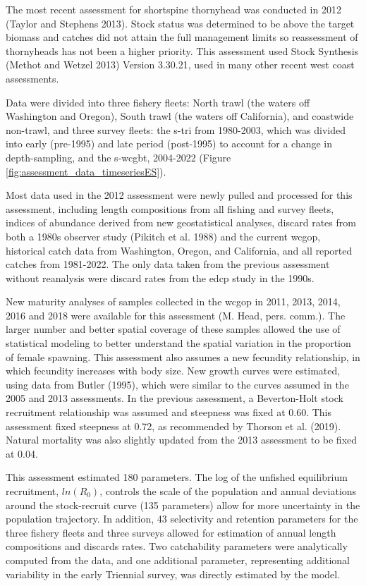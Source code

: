 \documentclass[11pt,
  english,
  letterpaper,
]{article}
\begin{document}
The most recent assessment for shortspine thornyhead was conducted in 2012 (Taylor and Stephens 2013). Stock status was determined to be above the target biomass and catches did not attain the full management limits so reassessment of thornyheads has not been a higher priority. This assessment used Stock Synthesis (Methot and Wetzel 2013) Version 3.30.21, used in many other recent west coast assessments.

Data were divided into three fishery fleets: North trawl (the waters off Washington and Oregon), South trawl (the waters off California), and coastwide non-trawl, and three survey fleets: the \gls{s-tri} from 1980-2003, which was divided into early (pre-1995) and late period (post-1995) to account for a change in depth-sampling, and the \gls{s-wcgbt}, 2004-2022 (Figure \ref{fig:assessment_data_timeseriesES}).

Most data used in the 2012 assessment were newly pulled and processed for this assessment, including length compositions from all fishing and survey fleets, indices of abundance derived from new geostatistical analyses, discard rates from both a 1980s observer study (Pikitch et al. 1988) and the current \gls{wcgop}, historical catch data from Washington, Oregon, and California, and all reported catches from 1981-2022. The only data taken from the previous assessment without reanalysis were discard rates from the \gls{edcp} study in the 1990s.

New maturity analyses of samples collected in the \gls{wcgop} in 2011, 2013, 2014, 2016 and 2018 were available for this assessment (M. Head, pers. comm.). The larger number and better spatial coverage of these samples allowed the use of statistical modeling to better understand the spatial variation in the proportion of female spawning. This assessment also assumes a new fecundity relationship, in which fecundity increases with body size. New growth curves were estimated, using data from Butler (1995), which were similar to the curves assumed in the 2005 and 2013 assessments. In the previous assessment, a Beverton-Holt stock recruitment relationship was assumed and steepness was fixed at 0.60. This assessment fixed steepness at 0.72, as recommended by Thorson et al. (2019). Natural mortality was also slightly updated from the 2013 assessment to be fixed at 0.04.

This assessment estimated 180 parameters. The log of the unfished equilibrium recruitment, \(ln(R_0)\), controls the scale of the population and annual deviations around the stock-recruit curve (135 parameters) allow for more uncertainty in the population trajectory. In addition, 43 selectivity and retention parameters for the three fishery fleets and three surveys allowed for estimation of annual length compositions and discards rates. Two catchability parameters were analytically computed from the data, and one additional parameter, representing additional variability in the early Triennial survey, was directly estimated by the model.
\end{document}
